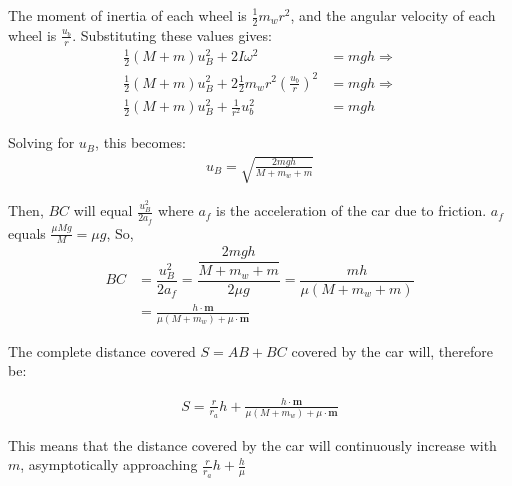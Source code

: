 \documentclass[titlepage,12pt]{article}
\begin{document}
        The moment of inertia of each wheel is $\frac{1}{2}m_wr^2$, and the angular velocity
        of each wheel is $\frac{u_b}{r}$. Substituting these values gives:
        \begin{align*}
            \frac{1}{2}(M+m)u_B^2 + 2I\omega^2                          &= mgh \Rightarrow \\
            \frac{1}{2}(M+m)u_B^2 + 2\frac{1}{2}m_wr^2(\frac{u_b}{r})^2 &= mgh \Rightarrow \\
            \frac{1}{2}(M+m)u_B^2 + \frac{1}{r^2}u_b^2 &= mgh
        \end{align*}

        Solving for $u_B$, this becomes:
        \begin{align*}
            u_B = \sqrt{\frac{2mgh}{M+m_w+m}}
        \end{align*}

        Then, $BC$ will equal $\frac{u_B^2}{2a_f}$ where $a_f$ is the acceleration of the
        car due to friction. $a_f$ equals $\frac{\mu M g}{M} = \mu g$, So, 
        \begin{align*}
            BC &= \dfrac{u_B^2}{2a_f} = \dfrac{\dfrac{2mgh}{M+m_w+m}}{2\mu g}
                                     = \dfrac{mh}{\mu(M+m_w+m)} \\
               &= \frac{h\cdot \mathbf{m}}{\mu(M+m_w) + \mu \cdot \textbf{m}}
        \end{align*}

        The complete distance covered $S=AB+BC$ covered by the car will, therefore be: 
        \begin{framed}
            \begin{equation} \label{eq:s_formula}
            \begin{aligned}
                S = \frac{r}{r_a}h + \frac{h\cdot \mathbf{m}}{\mu(M+m_w) + \mu \cdot \textbf{m}}
            \end{aligned}
            \end{equation}
        \end{framed}
        This means that the distance covered by the car will continuously increase with $m$,
        asymptotically approaching $\frac{r}{r_a}h + \frac{h}{\mu}$
\end{document}
